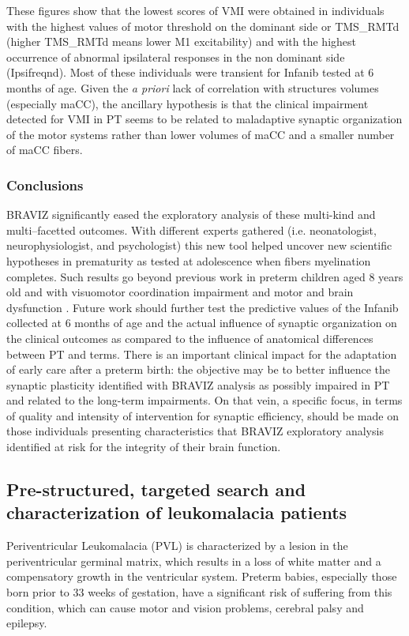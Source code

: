 \documentclass[twocolumn]{svjour3}
\begin{document}
These figures show that the lowest scores of VMI were obtained in individuals with the highest values of motor threshold on the dominant side or TMS\_RMTd (higher TMS\_RMTd means lower M1 excitability) and with the highest occurrence of abnormal ipsilateral responses in the non dominant side (Ipsifreqnd). Most of these individuals were transient for Infanib tested at 6 months of age. Given the \emph{a priori} lack of correlation with structures volumes (especially maCC), the ancillary hypothesis is that the clinical impairment detected for VMI in PT seems to be related to maladaptive synaptic organization of the motor systems rather than lower volumes of maCC and a smaller number of maCC fibers.

\subsubsection{Conclusions}

BRAVIZ significantly eased the exploratory analysis of these multi-kind and multi–facetted outcomes. With different experts gathered (i.e. neonatologist, neurophysiologist, and psychologist) this new tool helped uncover new scientific hypotheses in prematurity as tested at adolescence when fibers myelination completes. Such results go beyond previous work in preterm children aged 8 years old and with visuomotor coordination impairment and motor and brain dysfunction \cite{schneider_visuo-motor_2008,flamand_brain_2012}. Future work should further test the predictive values of the Infanib collected at 6 months of age and the actual influence of synaptic organization on the clinical outcomes as compared to the influence of anatomical differences between PT and terms. There is an important clinical impact for the adaptation of early care after a preterm birth: the objective may be to better influence the synaptic plasticity identified with BRAVIZ analysis as possibly impaired in PT and related to the long-term impairments. On that vein, a specific focus, in terms of quality and intensity of intervention for synaptic efficiency, should be made on those individuals presenting characteristics that BRAVIZ exploratory analysis identified at risk for the integrity of their brain function.

  
\subsection{Pre-structured, targeted search and characterization of leukomalacia patients}
\label{sec_pvm_case}
Periventricular Leukomalacia (PVL) is characterized by a lesion in the periventricular germinal matrix, which results in a loss of white matter and a compensatory growth in the ventricular system. Preterm babies, especially those born prior to 33 weeks of gestation, have a significant risk of suffering from this condition, which can cause motor and vision problems, cerebral palsy and epilepsy.    
\end{document}
